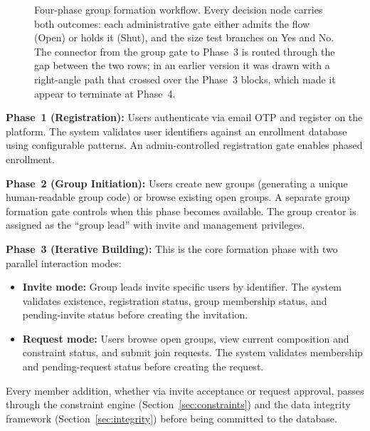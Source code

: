 \documentclass[11pt,a4paper]{article}
\theoremstyle{plain}
\theoremstyle{definition}
\theoremstyle{remark}
\begin{document}
\begin{figure}[htbp]
\caption{Four-phase group formation workflow. Every decision node carries both outcomes: each administrative gate either admits the flow (Open) or holds it (Shut), and the size test branches on Yes and No. The connector from the group gate to Phase~3 is routed through the gap between the two rows; in an earlier version it was drawn with a right-angle path that crossed over the Phase~3 blocks, which made it appear to terminate at Phase~4.}
\label{fig:workflow}
\end{figure}

\textbf{Phase~1 (Registration):} Users authenticate via email OTP and register on the platform. The system validates user identifiers against an enrollment database using configurable patterns. An admin-controlled registration gate enables phased enrollment.

\textbf{Phase~2 (Group Initiation):} Users create new groups (generating a unique human-readable group code) or browse existing open groups. A separate group formation gate controls when this phase becomes available. The group creator is assigned as the ``group lead'' with invite and management privileges.

\textbf{Phase~3 (Iterative Building):} This is the core formation phase with two parallel interaction modes:
\begin{itemize}[noitemsep,topsep=3pt]
    \item \textbf{Invite mode:} Group leads invite specific users by identifier. The system validates existence, registration status, group membership status, and pending-invite status before creating the invitation.
    \item \textbf{Request mode:} Users browse open groups, view current composition and constraint status, and submit join requests. The system validates membership and pending-request status before creating the request.
\end{itemize}
Every member addition, whether via invite acceptance or request approval, passes through the constraint engine (Section~\ref{sec:constraints}) and the data integrity framework (Section~\ref{sec:integrity}) before being committed to the database.
\end{document}
